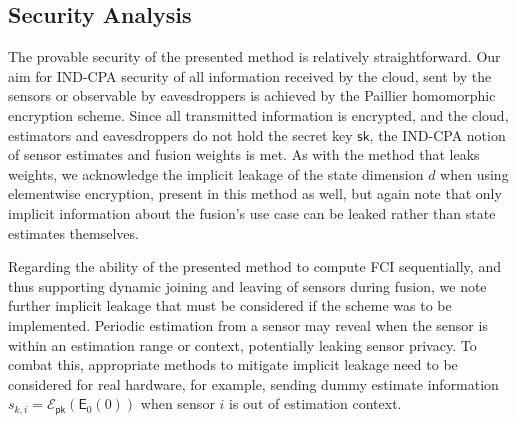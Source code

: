 % 
% 

\subsection{Security Analysis}\label{subsec:cloud_fusion:secfci2_security}
The provable security of the presented method is relatively straightforward. Our aim for IND-CPA security of all information received by the cloud, sent by the sensors or observable by eavesdroppers is achieved by the Paillier homomorphic encryption scheme. Since all transmitted information is encrypted, and the cloud, estimators and eavesdroppers do not hold the secret key $\mathsf{sk}$, the IND-CPA notion of sensor estimates and fusion weights is met. As with the method that leaks weights, we acknowledge the implicit leakage of the state dimension $d$ when using elementwise encryption, present in this method as well, but again note that only implicit information about the fusion's use case can be leaked rather than state estimates themselves.

Regarding the ability of the presented method to compute FCI sequentially, and thus supporting dynamic joining and leaving of sensors during fusion, we note further implicit leakage that must be considered if the scheme was to be implemented. Periodic estimation from a sensor may reveal when the sensor is within an estimation range or context, potentially leaking sensor privacy. To combat this, appropriate methods to mitigate implicit leakage need to be considered for real hardware, for example, sending dummy estimate information $s_{k, i}=\mathcal{E}_{\mathsf{pk}}(\mathsf{E}_0(0))$ when sensor $i$ is out of estimation context.

% 
% 
